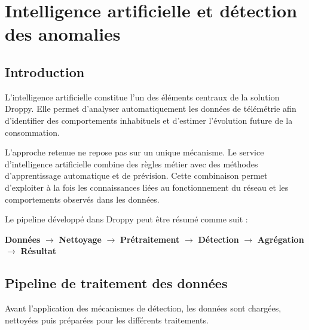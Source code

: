 
\chapter{Intelligence artificielle et détection des anomalies}


\section{Introduction}

L'intelligence artificielle constitue l'un des éléments centraux de la
solution Droppy. Elle permet d'analyser automatiquement les données de
télémétrie afin d'identifier des comportements inhabituels et d'estimer
l'évolution future de la consommation.

L'approche retenue ne repose pas sur un unique mécanisme. Le service
d'intelligence artificielle combine des règles métier avec des méthodes
d'apprentissage automatique et de prévision. Cette combinaison permet
d'exploiter à la fois les connaissances liées au fonctionnement du réseau
et les comportements observés dans les données.

Le pipeline développé dans Droppy peut être résumé comme suit :

\begin{center}
\textbf{Données}
$\rightarrow$
\textbf{Nettoyage}
$\rightarrow$
\textbf{Prétraitement}
$\rightarrow$
\textbf{Détection}
$\rightarrow$
\textbf{Agrégation}
$\rightarrow$
\textbf{Résultat}
\end{center}



\section{Pipeline de traitement des données}

Avant l'application des mécanismes de détection, les données sont chargées,
nettoyées puis préparées pour les différents traitements.

